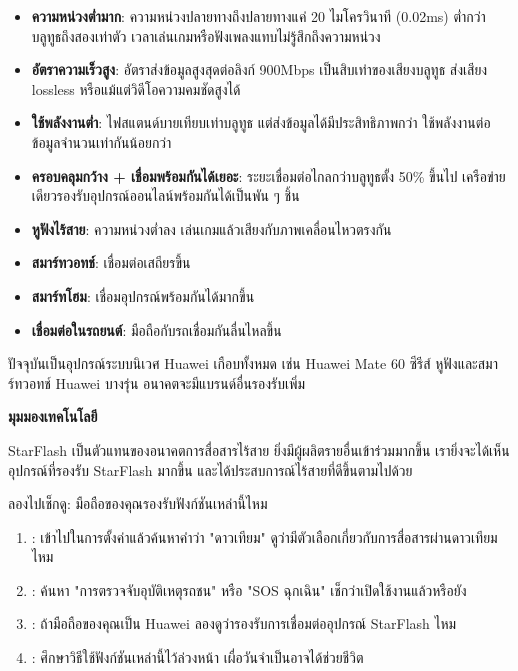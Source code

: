 \begin{itemize}
  \item \textbf{ความหน่วงต่ำมาก}: ความหน่วงปลายทางถึงปลายทางแค่ 20 ไมโครวินาที (0.02ms) ต่ำกว่าบลูทูธถึงสองเท่าตัว เวลาเล่นเกมหรือฟังเพลงแทบไม่รู้สึกถึงความหน่วง
  \item \textbf{อัตราความเร็วสูง}: อัตราส่งข้อมูลสูงสุดต่อลิงก์ 900Mbps เป็นสิบเท่าของเสียงบลูทูธ ส่งเสียง lossless หรือแม้แต่วิดีโอความคมชัดสูงได้
  \item \textbf{ใช้พลังงานต่ำ}: ไฟสแตนด์บายเทียบเท่าบลูทูธ แต่ส่งข้อมูลได้มีประสิทธิภาพกว่า ใช้พลังงานต่อข้อมูลจำนวนเท่ากันน้อยกว่า
  \item \textbf{ครอบคลุมกว้าง + เชื่อมพร้อมกันได้เยอะ}: ระยะเชื่อมต่อไกลกว่าบลูทูธตั้ง 50\% ขึ้นไป เครือข่ายเดียวรองรับอุปกรณ์ออนไลน์พร้อมกันได้เป็นพัน ๆ ชิ้น
\end{itemize}


\begin{itemize}
  \item \textbf{หูฟังไร้สาย}: ความหน่วงต่ำลง เล่นเกมแล้วเสียงกับภาพเคลื่อนไหวตรงกัน
  \item \textbf{สมาร์ทวอทช์}: เชื่อมต่อเสถียรขึ้น
  \item \textbf{สมาร์ทโฮม}: เชื่อมอุปกรณ์พร้อมกันได้มากขึ้น
  \item \textbf{เชื่อมต่อในรถยนต์}: มือถือกับรถเชื่อมกันลื่นไหลขึ้น
\end{itemize}


ปัจจุบันเป็นอุปกรณ์ระบบนิเวศ Huawei เกือบทั้งหมด เช่น Huawei Mate 60 ซีรีส์ หูฟังและสมาร์ทวอทช์ Huawei บางรุ่น อนาคตจะมีแบรนด์อื่นรองรับเพิ่ม

\textbf{มุมมองเทคโนโลยี}\par

StarFlash เป็นตัวแทนของอนาคตการสื่อสารไร้สาย ยิ่งมีผู้ผลิตรายอื่นเข้าร่วมมากขึ้น เรายิ่งจะได้เห็นอุปกรณ์ที่รองรับ StarFlash มากขึ้น และได้ประสบการณ์ไร้สายที่ดีขึ้นตามไปด้วย

\begin{tcbpractice}{ลองไปเช็กดู: มือถือของคุณรองรับฟังก์ชันเหล่านี้ไหม}
\begin{enumerate}
  \item : เข้าไปในการตั้งค่าแล้วค้นหาคำว่า "ดาวเทียม" ดูว่ามีตัวเลือกเกี่ยวกับการสื่อสารผ่านดาวเทียมไหม
  \item : ค้นหา "การตรวจจับอุบัติเหตุรถชน" หรือ "SOS ฉุกเฉิน" เช็กว่าเปิดใช้งานแล้วหรือยัง
  \item : ถ้ามือถือของคุณเป็น Huawei ลองดูว่ารองรับการเชื่อมต่ออุปกรณ์ StarFlash ไหม
  \item : ศึกษาวิธีใช้ฟังก์ชันเหล่านี้ไว้ล่วงหน้า เผื่อวันจำเป็นอาจได้ช่วยชีวิต
\end{enumerate}

\end{tcbpractice}
